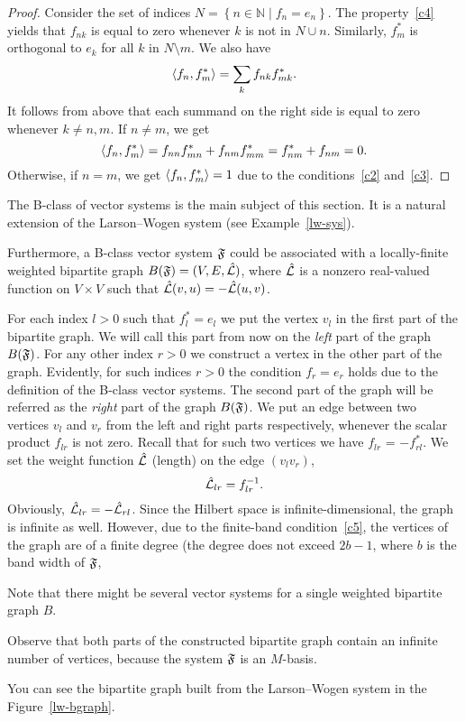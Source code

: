 \documentclass[12pt,oneside,a4paper]{amsart}
\begin{document}
    \begin{proof}
      Consider the set of indices $N = \left\{n \in \mathbb{N} \mid f_n = e_n \right\}$.
      The property~\ref{c4} yields that $f_{nk}$ is equal to zero whenever $k$ is not in $N \cup {n}$.
      Similarly, $f^*_m$ is orthogonal to $e_k$ for all $k$ in $N \setminus {m}$.
      We also have
      \[
        \langle f_n, f^*_m \rangle = \sum_{k} f_{nk} f_{mk}^*.
      \]
      It follows from above that each summand on the right side is equal to zero whenever $k \neq n, m$.
      If $n \neq m$, we get
      \[
        \langle f_n, f^*_m \rangle = f_{nn} f^*_{mn} + f_{nm} f^*_{mm}
        = f^*_{nm} + f_{nm} = 0.
      \]
      Otherwise, if $n = m$, we get $\langle f_n, f^*_m \rangle = 1$ due to the conditions~\ref{c2} and~\ref{c3}.
    \end{proof}
    The B-class of vector systems is the main subject of this section.
    It is a natural extension of the Larson--Wogen system (see Example~\ref{lw-sys}).

    Furthermore, a B-class vector system $\mathfrak{F}$ could be associated with a
      locally-finite weighted bipartite graph $B(\mathfrak{F}) = (V, E, \hat{\mathcal{L}})$, where $\hat{\mathcal{L}}$ is a
      nonzero real-valued function on $V\times V$ such that $\hat{\mathcal{L}}(v, u) = -\hat{\mathcal{L}}(u, v)$.

    For each index $l > 0$ such that $f^*_l = e_l$ we put the vertex $v_l$ in the first part of the bipartite graph.
    We will call this part from now on the \emph{left} part of the graph $B(\mathfrak{F})$.
    For any other index $r > 0$ we construct a vertex in the other part of the graph.
    Evidently, for such indices $r > 0$ the condition $f_r = e_r$ holds due to the definition of the B-class vector systems.
    The second part of the graph will be referred as the \emph{right} part of the graph $B(\mathfrak{F})$.
    We put an edge between two vertices $v_l$ and $v_r$ from the left and right parts respectively,
      whenever the scalar product $f_{lr}$ is not zero.
    Recall that for such two vertices we have $f_{lr}$ = $-f^*_{rl}$.
    We set the weight function $\hat{\mathcal{L}}$ (length) on the edge $(v_l v_r)$,
    \[
      \hat{\mathcal{L}}_{lr} = f_{lr}^{-1}.
    \]
    Obviously, $\hat{\mathcal{L}}_{lr} = -\hat{\mathcal{L}}_{rl}$.
    Since the Hilbert space is infinite-dimensional, the graph is infinite as well.
    However, due to the finite-band condition~\ref{c5}, the vertices of the graph are of a finite degree (the degree does not
      exceed $2b - 1$, where $b$ is the band width of $\mathfrak{F}$, 
    \begin{remark}
      Note that there might be several vector systems for a single weighted bipartite graph $B$.
    \end{remark}
    \begin{remark}
      Observe that both parts of the constructed bipartite graph contain an infinite number of vertices, because
        the system $\mathfrak{F}$ is an $M$-basis.
    \end{remark}
    You can see the bipartite graph built from the Larson--Wogen system in the Figure~\ref{lw-bgraph}.
\end{document}
